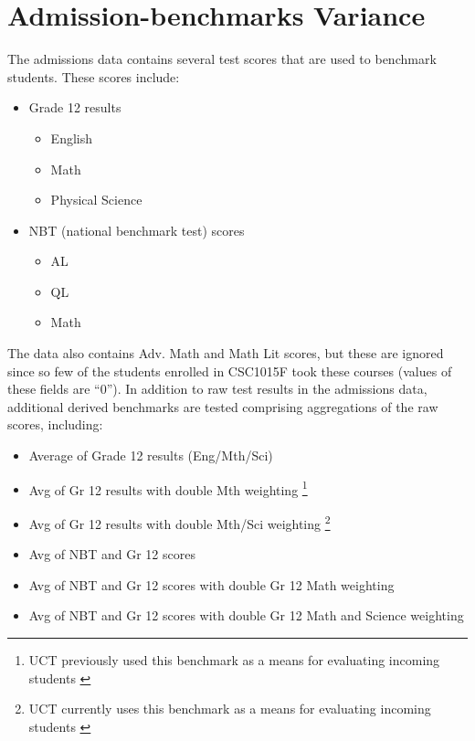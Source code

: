 \section{Admission-benchmarks Variance}
The admissions data contains several test scores that are used to benchmark students. These scores include:

\begin{itemize}
  \item Grade 12 results
        \begin{itemize}
          \item English
          \item Math
          \item Physical Science
        \end{itemize}
  \item NBT (national benchmark test) scores
        \begin{itemize}
          \item AL
          \item QL
          \item Math
        \end{itemize}
\end{itemize}

The data also contains Adv. Math and Math Lit scores, but these are ignored since so few of the students enrolled in CSC1015F took these courses (values of these fields are ``0''). In addition to raw test results in the admissions data, additional derived benchmarks are tested comprising aggregations of the raw scores, including:

\begin{itemize}
  \item Average of Grade 12 results (Eng/Mth/Sci)
  \item Avg of Gr 12 results with double Mth weighting \footnote{UCT previously used this benchmark as a means for evaluating incoming students \cite{sonia2018}}
  \item Avg of Gr 12 results with double Mth/Sci weighting \footnote{UCT currently uses this benchmark as a means for evaluating incoming students \cite{sonia2018}}
  \item Avg of NBT and Gr 12 scores
  \item Avg of NBT and Gr 12 scores with double Gr 12 Math weighting
  \item Avg of NBT and Gr 12 scores with double Gr 12 Math and Science weighting
\end{itemize}

